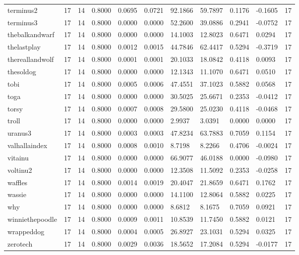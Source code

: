 \begin{table}[htbp]
\begin{tabular}{lllllllllll}
terminus2 & 17 & 14 & 0.8000 & 0.0695 & 0.0721 & 92.1866 & 59.7897 & 0.1176 & -0.1605 & 17 \\
terminus3 & 17 & 14 & 0.8000 & 0.0000 & 0.0000 & 52.2600 & 39.0886 & 0.2941 & -0.0752 & 17 \\
thebalkandwarf & 17 & 14 & 0.8000 & 0.0000 & 0.0000 & 14.1003 & 12.8023 & 0.6471 & 0.0294 & 17 \\
thelastplay & 17 & 14 & 0.8000 & 0.0012 & 0.0015 & 44.7846 & 62.4417 & 0.5294 & -0.3719 & 17 \\
thereallandwolf & 17 & 14 & 0.8000 & 0.0001 & 0.0001 & 20.1033 & 18.0842 & 0.4118 & 0.0093 & 17 \\
thesoldog & 17 & 14 & 0.8000 & 0.0000 & 0.0000 & 12.1343 & 11.1070 & 0.6471 & 0.0510 & 17 \\
tobi & 17 & 14 & 0.8000 & 0.0005 & 0.0006 & 47.4551 & 37.1023 & 0.5882 & 0.0568 & 17 \\
toga & 17 & 14 & 0.8000 & 0.0000 & 0.0000 & 30.5025 & 25.6671 & 0.2353 & -0.0412 & 17 \\
torsy & 17 & 14 & 0.8000 & 0.0007 & 0.0008 & 29.5800 & 25.0230 & 0.4118 & -0.0468 & 17 \\
troll & 17 & 14 & 0.8000 & 0.0000 & 0.0000 & 2.9937 & 3.0391 & 0.0000 & 0.0000 & 17 \\
uranus3 & 17 & 14 & 0.8000 & 0.0003 & 0.0003 & 47.8234 & 63.7883 & 0.7059 & 0.1154 & 17 \\
valhallaindex & 17 & 14 & 0.8000 & 0.0008 & 0.0010 & 8.7198 & 8.2266 & 0.4706 & -0.0024 & 17 \\
vitainu & 17 & 14 & 0.8000 & 0.0000 & 0.0000 & 66.9077 & 46.0188 & 0.0000 & -0.0980 & 17 \\
voltinu2 & 17 & 14 & 0.8000 & 0.0000 & 0.0000 & 12.3508 & 11.5092 & 0.2353 & -0.0258 & 17 \\
waffles & 17 & 14 & 0.8000 & 0.0014 & 0.0019 & 20.4047 & 21.8659 & 0.6471 & 0.1762 & 17 \\
wassie & 17 & 14 & 0.8000 & 0.0000 & 0.0000 & 14.1100 & 12.8064 & 0.5882 & 0.0225 & 17 \\
why & 17 & 14 & 0.8000 & 0.0000 & 0.0000 & 8.6812 & 8.1675 & 0.7059 & 0.0921 & 17 \\
winniethepoodle & 17 & 14 & 0.8000 & 0.0009 & 0.0011 & 10.8539 & 11.7450 & 0.5882 & 0.0121 & 17 \\
wrappeddog & 17 & 14 & 0.8000 & 0.0004 & 0.0005 & 26.8927 & 23.1031 & 0.5294 & 0.0325 & 17 \\
zerotech & 17 & 14 & 0.8000 & 0.0029 & 0.0036 & 18.5652 & 17.2084 & 0.5294 & -0.0177 & 17 \\

\end{tabular}
\end{table}

